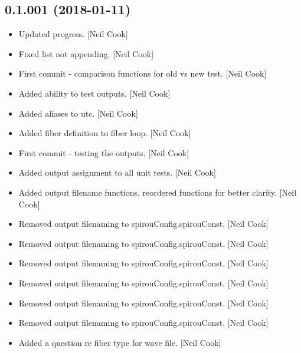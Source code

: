 \documentclass[a4paper,10pt,english]{report}
\begin{document}
\subsection{0.1.001 (2018-01-11)}
\label{\detokenize{misc/changelog:id502}}\begin{itemize}
\item {} 
Updated progress. {[}Neil Cook{]}

\item {} 
Fixed list not appending. {[}Neil Cook{]}

\item {} 
First commit - comparison functions for old vs new test. {[}Neil Cook{]}

\item {} 
Added ability to test outputs. {[}Neil Cook{]}

\item {} 
Added aliases to utc. {[}Neil Cook{]}

\item {} 
Added fiber definition to fiber loop. {[}Neil Cook{]}

\item {} 
First commit  - testing the outputs. {[}Neil Cook{]}

\item {} 
Added output assignment to all unit tests. {[}Neil Cook{]}

\item {} 
Added output filename functions, reordered functions for better
clarity. {[}Neil Cook{]}

\item {} 
Removed output filenaming to spirouConfig.spirouConst. {[}Neil Cook{]}

\item {} 
Removed output filenaming to spirouConfig.spirouConst. {[}Neil Cook{]}

\item {} 
Removed output filenaming to spirouConfig.spirouConst. {[}Neil Cook{]}

\item {} 
Removed output filenaming to spirouConfig.spirouConst. {[}Neil Cook{]}

\item {} 
Removed output filenaming to spirouConfig.spirouConst. {[}Neil Cook{]}

\item {} 
Removed output filenaming to spirouConfig.spirouConst. {[}Neil Cook{]}

\item {} 
Added a question re fiber type for wave file. {[}Neil Cook{]}


\end{itemize}
\end{document}
